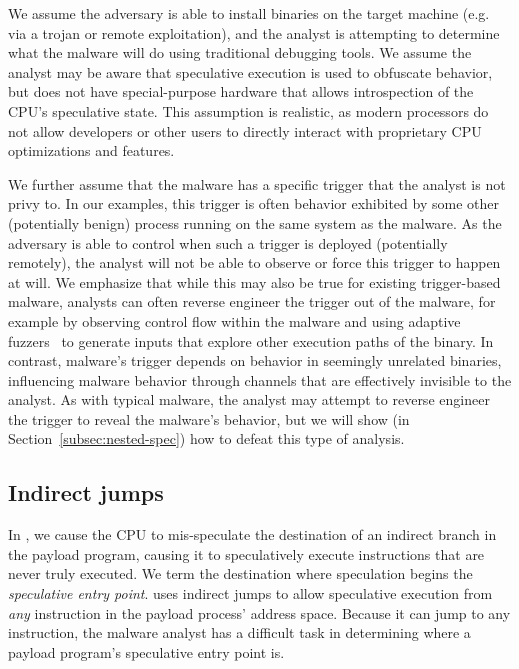We assume the adversary is able to install binaries on the target machine
(e.g. via a trojan or remote exploitation), and the analyst is attempting to
determine what the malware will do using traditional debugging tools. We assume
the analyst may be aware that speculative execution is used to obfuscate
behavior, but does not have special-purpose hardware that allows introspection of
the CPU's speculative state. This assumption is realistic, as modern processors
do not allow developers or other users to directly interact with proprietary CPU
optimizations and features.

We further assume that the malware has a specific trigger that the analyst is
not privy to. In our examples, this trigger is often behavior exhibited by some
other (potentially benign) process running on the same system as the malware.
As the adversary is able to control when such a trigger is deployed (potentially
remotely), the analyst will not be able to observe or force this trigger to
happen at will. We emphasize that while this may also be true for existing
trigger-based malware, analysts can often reverse engineer the trigger out of
the malware, for example by observing control flow within the malware and using
adaptive fuzzers~\cite{afl,stephens2016driller} to generate inputs that explore other execution
paths of the binary. In contrast, \speculake malware's trigger depends on
behavior in seemingly unrelated binaries, influencing malware behavior through
channels that are effectively invisible to the analyst. As with typical malware, the analyst may
attempt to reverse engineer the trigger to reveal the malware's behavior, but we
will show (in Section~\ref{subsec:nested-spec}) how to defeat this type of
analysis.

\subsection{Indirect jumps}


In \speculake, we cause the CPU to mis-speculate the destination of an indirect
branch in the payload program, causing it to speculatively execute 
instructions that are never truly executed. We term the destination where speculation begins
the \emph{speculative entry point}. \speculake uses indirect jumps to allow
speculative execution from \emph{any} instruction in the payload process'
address space. Because it can jump to any instruction, the malware analyst has a
difficult task in determining where a payload program's speculative entry point
is.

